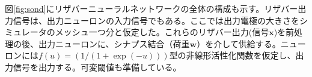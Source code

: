 \documentclass[a4j, twocolumn]{jsarticle}
\begin{document}
図\ref{fig:sond}にリザバーニューラルネットワークの全体の構成も示す。リザバー出力信号は、出力ニューロンの入力信号でもある。ここでは出力電極の大きさをシミュレータのメッシュ一つ分と仮定した。これらのリザバー出力(信号$\bm{x}$)を前処理の後、出力ニューロンに、シナプス結合（荷重$\bm{w}$）を介して供給する。ニューロンには$f ( u ) = (1/(1+\exp(-u)))$型の非線形活性化関数を仮定し、出力信号を出力する。可変閾値も準備している。
\end{document}
